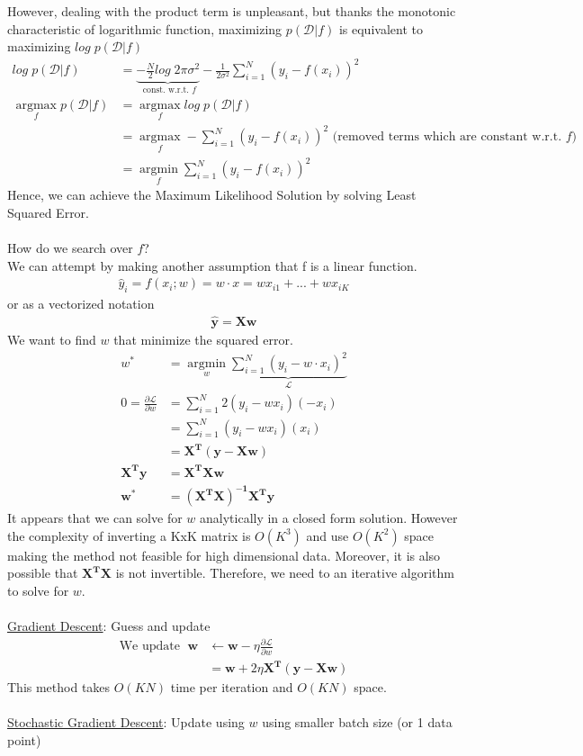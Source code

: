However, dealing with the product term is unpleasant, but thanks the monotonic characteristic of logarithmic function, maximizing $p(\mathcal{D}|f)$ is equivalent to maximizing $log\; p(\mathcal{D}|f)$
\begin{align*}
log\; p(\mathcal{D}|f) &= \underbrace{-\frac{N}{2} log\; 2\pi\sigma^2}_\text{ const. w.r.t. $f$} - \frac{1}{2\sigma^2}\sum_{i=1}^N(y_i - f(x_i))^2\\
\operatorname*{argmax}_f p(\mathcal{D}|f)  &= \operatorname*{argmax}_f log\; p(\mathcal{D}|f)\\
&= \operatorname*{argmax}_f - \sum_{i=1}^N(y_i - f(x_i))^2 \text{ (removed terms which are constant w.r.t. $f$)}\\
&= \operatorname*{argmin}_f \sum_{i=1}^N(y_i - f(x_i))^2
\end{align*}
Hence, we can achieve the Maximum Likelihood Solution by solving Least Squared Error.\\
\\
How do we search over $f$?\\
We can attempt by making another assumption that f is a linear function.
\begin{align*}
\hat{y}_i = f(x_i;w) = w\cdot x =wx_{i1} + ... + wx_{iK} 
\end{align*}
or as a vectorized notation
\begin{align*}
\boldsymbol{\hat{y}} = \boldsymbol{Xw}
\end{align*}
We want to find $w$ that minimize the squared error.
\begin{align*}
w^{*} &= \operatorname*{argmin}_w \underbrace{\sum_{i=1}^N(y_i - w\cdot x_i)^2}_\mathcal{L}\\
0 = \frac{\partial \mathcal{L}}{\partial w} &= \sum_{i=1}^N 2(y_i - wx_i)(-x_i)\\
&= \sum_{i=1}^N (y_i - wx_i)(x_i)\\
&= \boldsymbol{X^{T}(y-Xw)}\\
\boldsymbol{X^{T}y} &= \boldsymbol{X^{T}Xw}\\
\boldsymbol{w^{*}} &=  \boldsymbol{(X^{T}X)^{-1}X^{T}y}
\end{align*}
It appears that we can solve for $w$ analytically in a closed form solution. However the complexity of inverting a KxK matrix is $O(K^3)$ and use  $O(K^2)$ space making the method not feasible for high dimensional data. Moreover, it is also possible that $\boldsymbol{X^{T}X}$ is not invertible. Therefore, we need to an iterative algorithm to solve for $w$.\\
\\
\underline{Gradient Descent}: Guess and update
\begin{align*}
\text{We update } \;\boldsymbol{w} &\leftarrow \boldsymbol{w} - \eta \frac{\partial \mathcal{L}}{\partial w}\\
&= \boldsymbol{w} + 2\eta \boldsymbol{X^{T}(y-Xw)}
\end{align*}
This method takes $O(KN)$ time per iteration and $O(KN)$ space.\\
\\
\underline{Stochastic Gradient Descent}: Update using $w$ using smaller batch size (or 1 data point)

